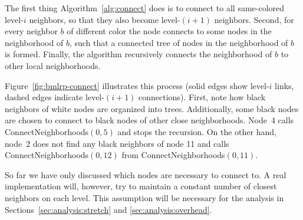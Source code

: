 \documentclass[conference]{IEEEtran}
\theoremstyle{definition}
\begin{document}
The first thing Algorithm~\ref{alg:connect} does is to connect to all same-colored level-$i$ neighbors, so that they also become level-$(i+1)$ neighbors. Second, for every neighbor $b$ of different color the node connects to some nodes in the neighborhood of $b$, such that a connected tree of nodes in the neighborhood of $b$ is formed. Finally, the algorithm recursively connects the neighborhood of $b$ to other local neighborhoods.

Figure~\ref{fig:bmlrp-connect} illustrates this process (solid edges show 
level-$i$ links, dashed edges indicate level-$(i+1)$ connections). First, note how black neighbors of white nodes are organized into trees. Additionally, some black nodes are chosen to connect to black nodes of other close neighborhoods. Node~4 calls ConnectNeighborhoods$(0, 5)$ and stops the recursion. On the other hand, node~2 does not find any black neighbors of node 11 and 
calls ConnectNeighborhoods$(0, 12)$ from ConnectNeighborhoods$(0, 11)$.



So far we have only discussed which nodes are necessary to connect to. A real implementation will, however, try to maintain a constant number of closest neighbors on each level. This assumption will be necessary for 
the analysis in Sections~\ref{sec:analysis:stretch} and \ref{sec:analysis:overhead}.
\end{document}
